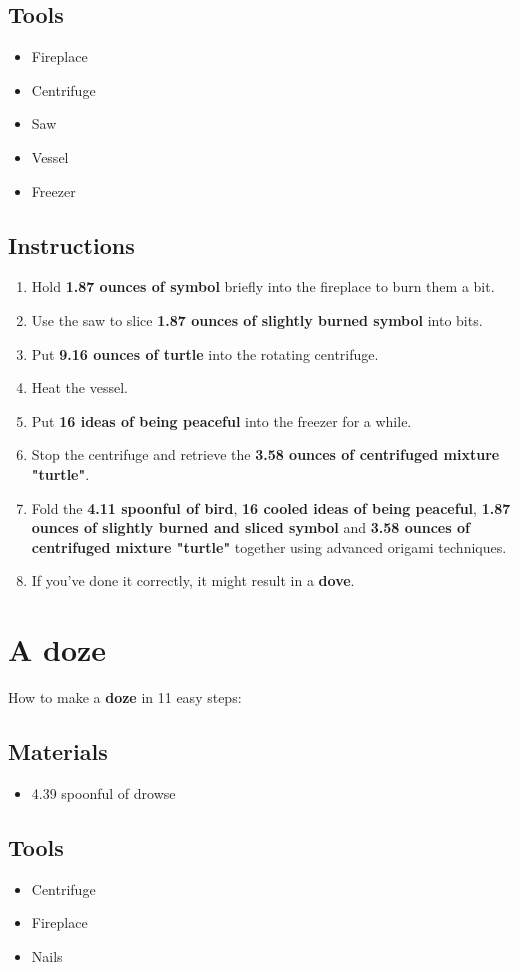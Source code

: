 \documentclass{article}
\begin{document}
\subsection{Tools}\begin{itemize}
\item 
Fireplace
\item 
Centrifuge
\item 
Saw
\item 
Vessel
\item 
Freezer
\end{itemize}
\subsection{Instructions}\begin{enumerate}
\item 
Hold \textbf{1.87 ounces of symbol} briefly into the fireplace to burn them a bit.
\item 
Use the saw to slice \textbf{1.87 ounces of slightly burned symbol} into bits.
\item 
Put \textbf{9.16 ounces of turtle} into the rotating centrifuge.
\item 
Heat the vessel.
\item 
Put \textbf{16 ideas of being peaceful} into the freezer for a while.
\item 
Stop the centrifuge and retrieve the \textbf{3.58 ounces of centrifuged mixture "turtle"}.
\item 
Fold the \textbf{4.11 spoonful of bird}, \textbf{16 cooled ideas of being peaceful}, \textbf{1.87 ounces of slightly burned and sliced symbol} and \textbf{3.58 ounces of centrifuged mixture "turtle"} together using advanced origami techniques.
\item 
If you've done it correctly, it might result in a \textbf{dove}.
\end{enumerate}
\newpage
\section{A doze}How to make a \textbf{doze} in 11 easy steps:

\subsection{Materials}\begin{itemize}
\item 
4.39 spoonful of drowse
\end{itemize}
\subsection{Tools}\begin{itemize}
\item 
Centrifuge
\item 
Fireplace
\item 
Nails
\end{itemize}
\end{document}
